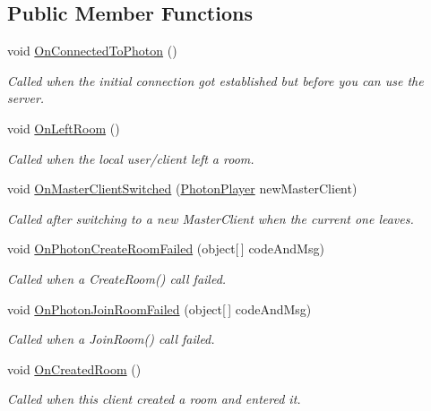 \subsection*{Public Member Functions}
\begin{DoxyCompactItemize}
\item 
void \hyperlink{interface_i_pun_callbacks_aa9014980a1dc2d9befc6129668c890a2}{On\+Connected\+To\+Photon} ()
\begin{DoxyCompactList}\small\item\em Called when the initial connection got established but before you can use the server. \end{DoxyCompactList}\item 
void \hyperlink{interface_i_pun_callbacks_ac6d7fe9f1dfe9aec1562c262a90f7d5b}{On\+Left\+Room} ()
\begin{DoxyCompactList}\small\item\em Called when the local user/client left a room. \end{DoxyCompactList}\item 
void \hyperlink{interface_i_pun_callbacks_abee2c86784a9a700b9f5b4073bd00be7}{On\+Master\+Client\+Switched} (\hyperlink{class_photon_player}{Photon\+Player} new\+Master\+Client)
\begin{DoxyCompactList}\small\item\em Called after switching to a new Master\+Client when the current one leaves. \end{DoxyCompactList}\item 
void \hyperlink{interface_i_pun_callbacks_a523ce991e9a0dcde1b57b13e4e3db38c}{On\+Photon\+Create\+Room\+Failed} (object\mbox{[}$\,$\mbox{]} code\+And\+Msg)
\begin{DoxyCompactList}\small\item\em Called when a Create\+Room() call failed. \end{DoxyCompactList}\item 
void \hyperlink{interface_i_pun_callbacks_ad56f84b6647d2e61d273db297deb08b1}{On\+Photon\+Join\+Room\+Failed} (object\mbox{[}$\,$\mbox{]} code\+And\+Msg)
\begin{DoxyCompactList}\small\item\em Called when a Join\+Room() call failed. \end{DoxyCompactList}\item 
void \hyperlink{interface_i_pun_callbacks_a5d06d8035078d422f08b0c72c97ab136}{On\+Created\+Room} ()
\begin{DoxyCompactList}\small\item\em Called when this client created a room and entered it. \end{DoxyCompactList}\item 

\end{DoxyCompactItemize}
